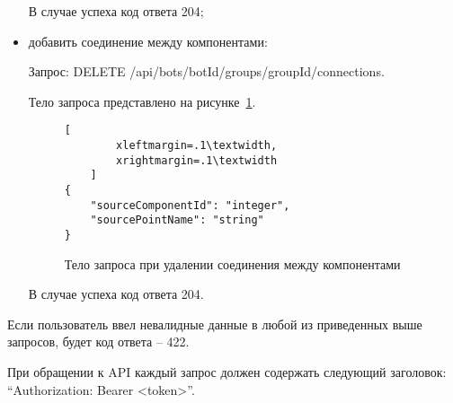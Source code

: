\begin{itemize}
	      В случае успеха код ответа 204;

	\item добавить соединение между компонентами:

	      Запрос: DELETE /api/bots/{botId}/groups/{groupId}/connections.

	      Тело запроса представлено на рисунке~\ref{f:delete-connection}.

	      \begin{figure}[ht]
		      \centering
		      \vspace{\toppaddingoffigure}
		      \begin{lstlisting}[
        xleftmargin=.1\textwidth,
        xrightmargin=.1\textwidth
    ]
{
    "sourceComponentId": "integer",
    "sourcePointName": "string"
}
    \end{lstlisting}
		      \caption{Тело запроса при удалении соединения между компонентами}
		      \label{f:delete-connection}
	      \end{figure}

	      В случае успеха код ответа 204.

\end{itemize}

Если пользователь ввел невалидные данные в любой из приведенных
выше запросов, будет код ответа – 422.

При обращении к API каждый запрос должен содержать следующий
заголовок: “Authorization: Bearer <token>”.
